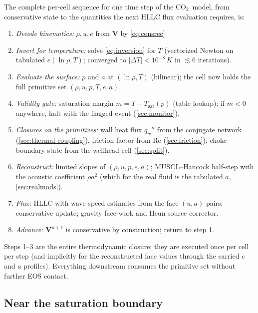 \documentclass[11pt]{article}
\newcommand{\co}{CO$_2$}
\begin{document}
The complete per-cell sequence for one time step of the \co\ model,
from conservative state to the quantities the next HLLC flux
evaluation requires, is:
\begin{enumerate}
\item \emph{Decode kinematics:} $\rho, u, e$ from $\mathbf{V}$ by
\cref{eq:consrec}.
\item \emph{Invert for temperature:} solve \cref{eq:inversion} for
$T$ (vectorized Newton on tabulated $e(\ln\rho, T)$; converged to
$|\Delta T| < 10^{-8}\,\si{K}$ in $\lesssim 6$ iterations).
\item \emph{Evaluate the surface:} $p$ and $a$ at $(\ln\rho, T)$
(bilinear); the cell now holds the full primitive set
$(\rho, u, p, T, e, a)$.
\item \emph{Validity gate:} saturation margin
$m = T - T_{\mathrm{sat}}(p)$ (table lookup); if $m < 0$ anywhere,
halt with the flagged event (\cref{sec:monitor}).
\item \emph{Closures on the primitives:} wall heat flux $q_w''$ from
the conjugate network (\cref{sec:thermal-coupling}), friction factor
from Re (\cref{sec:friction}); choke boundary state from the wellhead
cell (\cref{sec:split}).
\item \emph{Reconstruct:} limited slopes of
$(\rho, u, p, e, a)$; MUSCL--Hancock half-step with the acoustic
coefficient $\rho a^2$ (which for the real fluid is the tabulated
$a$, \cref{sec:realmods}).
\item \emph{Flux:} HLLC with wave-speed estimates from the face
$(u, a)$ pairs; conservative update; gravity face-work and Heun
source corrector.
\item \emph{Advance:} $\mathbf{V}^{n+1}$ is conservative by
construction; return to step 1.
\end{enumerate}
Steps 1--3 are the entire thermodynamic closure; they are executed
once per cell per step (and implicitly for the reconstructed face
values through the carried $e$ and $a$ profiles). Everything
downstream consumes the primitive set without further EOS contact.

\subsection{Near the saturation boundary}
\label{app:dome}
\end{document}
